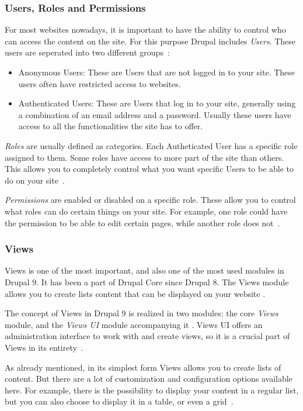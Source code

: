 \subsubsection{Users, Roles and Permissions}

For most websites nowadays, it is important to have the ability to control who can access the content on the site. For this purpose Drupal includes \emph{Users}. These users are seperated into two different groups~\autocite{Tomlinson2015}:
\begin{itemize}
	\item  Anonymous Users: These are Users that are not logged in to your site. These users often have restricted access to websites.
	\item  Authenticated Users: These are Users that log in to your site, generally using a combination of an email address and a password. Usually these users have access to all the functionalities the site has to offer.
\end{itemize}

\emph{Roles} are usually defined as categories. Each Autheticated User has a specific role assigned to them. Some roles have access to more part of the site than others. This allows you to completely control what you want specific Users to be able to do on your site~\autocite{Tomlinson2015}.

\emph{Permissions} are enabled or disabled on a specific role. These allow you to control what roles can do certain things on your site. For example, one role could have the permission to be able to edit certain pages, while another role does not~\autocite{Tomlinson2015}.

\subsubsection{Views}

Views is one of the most important, and also one of the most used modules in Drupal 9. It has been a part of Drupal Core since Drupal 8. The Views module allows you to create lists content that can be displayed on your website \autocite{DrupalViews}.

The concept of Views in Drupal 9 is realized in two modules: the core \emph{Views} module, and the \emph{Views UI} module accompanying it \autocite{DrupalViews}. Views UI offers an administration interface to work with and create views, so it is a crucial part of Views in its entirety~\autocite{Tomlinson2015}.

As already mentioned, in its simplest form Views allows you to create lists of content. But there are a lot of customization and configuration options available here. For example, there is the possibility to display your content in a regular list, but you can also choose to display it in a table, or even a grid~\autocite{Tomlinson2015}.

